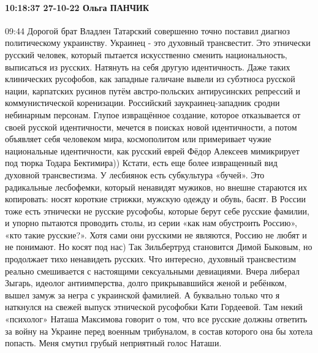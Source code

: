  
 
 
 
 

\paragraph{10:18:37 27-10-22 Ольга ПАНЧИК}

09:44
Дорогой брат Владлен Татарский совершенно точно поставил диагноз политическому украинству.
Украинец - это духовный трансвестит.
Это этнически русский человек, который пытается искусственно сменить национальность, выписаться из русских. Натянуть на себя другую идентичность.
Даже таких клинических русофобов, как западные галичане вывели из субэтноса русской нации, карпатских русинов путём австро-польских антирусинских репрессий и коммунистической коренизации.
Российский заукраинец-западник сродни небинарным персонам. Глупое извращённое создание, которое отказывается от своей русской идентичности, мечется в поисках новой идентичности, а потом объявляет себя человеком мира, космополитом или примеривает чужие национальные идентичности, как русский еврей Фёдор Алексеев мимикрирует под тюрка Тодара Бектимира))
Кстати, есть еще более извращенный вид духовной трансвестизма. У лесбиянок есть субкультура «бучей». Это радикальные лесбофемки, который ненавидят мужиков, но внешне стараются их копировать: носят короткие стрижки, мужскую одежду и обувь, басят.
В России тоже есть этнически не русские русофобы, которые берут себе русские фамилии, и упорно пытаются проводить столы, из серии «как нам обустроить Россию», «кто такие русские?». Хотя сами они русскими не являются, Россию не любят и не понимают. Но косят под нас)
Так Зильбертруд становится Димой Быковым, но продолжает тихо ненавидеть русских.
Что интересно, духовный трансвестизм реально смешивается с настоящими сексуальными девиациями.
Вчера либерал Зыгарь, идеолог антиимперства, долго прикрывавшийся женой и ребёнком, вышел замуж за негра с украинской фамилией.
А буквально только что я наткнулся на свежей выпуск этнической русофобки Кати Гордеевой.
Там некий «психолог» Наташа Максимова говорит о том, что все русские должны ответить за войну на Украине перед военным трибуналом, в состав которого она бы хотела попасть.
Меня смутил грубый неприятный голос Наташи.
